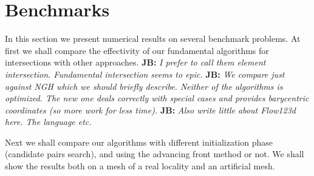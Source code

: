 \documentclass{elsarticle}
\newcommand{\noteJB}[1]{{\color{Blue} \textbf{JB: } \textit{#1}}}
\begin{document}
% 





\section{Benchmarks}
\label{sec:benchmarks}
In this section we present numerical results on several benchmark problems. At first we shall compare 
the effectivity of our fundamental algorithms for intersections with other approaches.
\noteJB{I prefer to call them element intersection. Fundamental intersection seems to epic.}
\noteJB{We compare just against NGH which we should briefly describe. Neither of the algorithms is optimized. The new one deals correctly with special cases and provides 
barycentric coordinates (so more work for less time).}
\noteJB{Also write little about Flow123d here. The language etc.}

Next we shall compare our algorithms with different initialization phase (candidate pairs search),
and using the advancing front method or not. We shall show the results both on a mesh of a real locality
and an artificial mesh.
\end{document}
